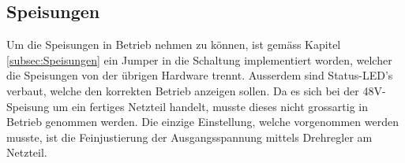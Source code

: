 \subsection{Speisungen}
\label{subsec:Inbetriebnahme_Speisungen}

Um die Speisungen in Betrieb nehmen zu können, ist gemäss Kapitel \ref{subsec:Speisungen} ein Jumper in die Schaltung implementiert worden, welcher die Speisungen von der übrigen Hardware trennt. Ausserdem sind Status-LED's verbaut, welche den korrekten Betrieb anzeigen sollen. Da es sich bei der 48V-Speisung um ein fertiges Netzteil handelt, musste dieses nicht grossartig in Betrieb genommen werden. Die einzige Einstellung, welche vorgenommen werden musste, ist die Feinjustierung der Ausgangsspannung mittels Drehregler am Netzteil.
